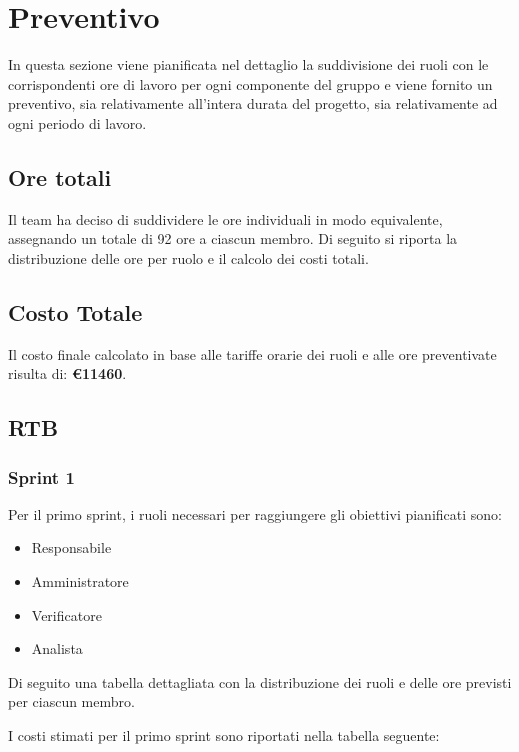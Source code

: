 \section{Preventivo}
In questa sezione viene pianificata nel dettaglio la suddivisione dei ruoli con le corrispondenti ore di lavoro per
ogni componente del gruppo e viene fornito un preventivo, sia relativamente all'intera durata del progetto,
sia relativamente ad ogni periodo di lavoro.

\subsection{Ore totali}
Il team ha deciso di suddividere le ore individuali in modo equivalente, assegnando un totale di 92 ore a ciascun membro. 
Di seguito si riporta la distribuzione delle ore per ruolo e il calcolo dei costi totali.




\subsection{Costo Totale}
Il costo finale calcolato in base alle tariffe orarie dei ruoli e alle ore preventivate risulta di: \textbf{\euro 11460}.

 \subsection{RTB}

 \subsubsection{Sprint 1}
Per il primo sprint, i ruoli necessari per raggiungere gli obiettivi pianificati sono:
 \begin{itemize}
     \item Responsabile
     \item Amministratore
     \item Verificatore
     \item Analista
 \end{itemize} 

\newpage
Di seguito una tabella dettagliata con la distribuzione dei ruoli e delle ore previsti per ciascun membro.




I costi stimati per il primo sprint sono riportati nella tabella seguente:




